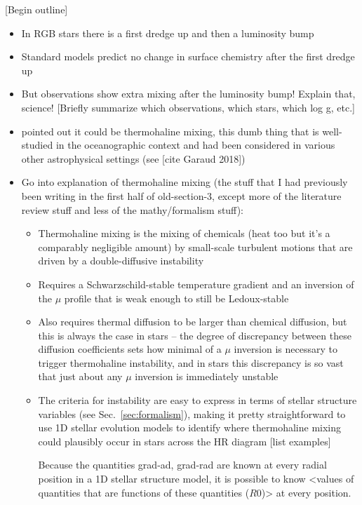 [Begin outline]

\begin{itemize}
    \item In RGB stars there is a first dredge up and then a luminosity bump
    \item Standard models predict no change in surface chemistry after the first dredge up
    \item But observations show extra mixing after the luminosity bump! Explain that, science! [Briefly summarize which observations, which stars, which log g, etc.]
    \item \citet{charbonnel_thermohaline_2007} pointed out it could be thermohaline mixing, this dumb thing that is well-studied in the oceanographic context and had been considered in various other astrophysical settings (see [cite Garaud 2018])
    \item Go into explanation of thermohaline mixing (the stuff that I had previously been writing in the first half of old-section-3, except more of the literature review stuff and less of the mathy/formalism stuff):
    \begin{itemize}
        \item Thermohaline mixing is the mixing of chemicals (heat too but it's a comparably negligible amount) by small-scale turbulent motions that are driven by a double-diffusive instability
        \item Requires a Schwarzschild-stable temperature gradient and an inversion of the $\mu$ profile that is weak enough to still be Ledoux-stable
        \item Also requires thermal diffusion to be larger than chemical diffusion, but this is always the case in stars -- the degree of discrepancy between these diffusion coefficients sets how minimal of a $\mu$ inversion is necessary to trigger thermohaline instability, and in stars this discrepancy is so vast that just about any $\mu$ inversion is immediately unstable
        
        \item The criteria for instability are easy to express in terms of stellar structure variables (see Sec.~\ref{sec:formalism}), making it pretty straightforward to use 1D stellar evolution models to identify where thermohaline mixing could plausibly occur in stars across the HR diagram [list examples]
        
        Because the quantities grad-ad, grad-rad are known at every radial position in a 1D stellar structure model, it is possible to know <values of quantities that are functions of these quantities ($R0$)> at every position. 
        

\end{itemize}
\end{itemize}
